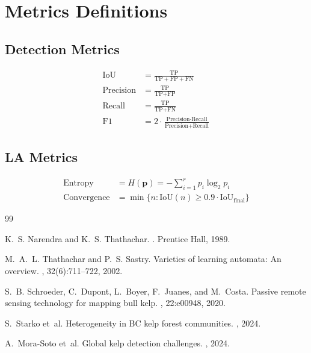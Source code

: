 \documentclass[11pt,a4paper]{article}
\begin{document}
\section{Metrics Definitions}
\label{app:metrics}

\subsection{Detection Metrics}

\begin{align}
\text{IoU} &= \frac{\text{TP}}{\text{TP} + \text{FP} + \text{FN}} \\
\text{Precision} &= \frac{\text{TP}}{\text{TP} + \text{FP}} \\
\text{Recall} &= \frac{\text{TP}}{\text{TP} + \text{FN}} \\
\text{F1} &= 2 \cdot \frac{\text{Precision} \cdot \text{Recall}}{\text{Precision} + \text{Recall}}
\end{align}

\subsection{LA Metrics}

\begin{align}
\text{Entropy} &= H(\mathbf{p}) = -\sum_{i=1}^{r} p_i \log_2 p_i \\
\text{Convergence} &= \min\{n : \text{IoU}(n) \geq 0.9 \cdot \text{IoU}_{\text{final}}\}
\end{align}



\begin{thebibliography}{99}

K.~S. Narendra and K.~S. Thathachar.
.
\newblock Prentice Hall, 1989.

M.~A.~L. Thathachar and P.~S. Sastry.
\newblock Varieties of learning automata: An overview.
, 32(6):711--722, 2002.

S.~B. Schroeder, C.~Dupont, L.~Boyer, F.~Juanes, and M.~Costa.
\newblock Passive remote sensing technology for mapping bull kelp.
, 22:e00948, 2020.

S.~Starko et~al.
\newblock Heterogeneity in BC kelp forest communities.
, 2024.

A.~Mora-Soto et~al.
\newblock Global kelp detection challenges.
, 2024.

\end{thebibliography}
\end{document}
